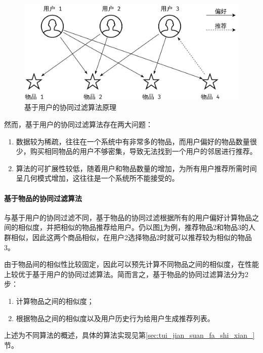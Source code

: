 \documentclass{article}
\begin{document}
\begin{figure}[htpb]
    \centering
    \includegraphics[width=0.8\linewidth]{userBasedCF.png}
    \caption{基于用户的协同过滤算法原理}
    \label{fig:userBasedCF}
\end{figure}
\par 然而，基于用户的协同过滤算法存在两大问题：
\begin{enumerate}
    \item 数据较为稀疏，往往在一个系统中有非常多的物品，而用户偏好的物品数量很少，购买相同物品的用户不够密集，导致无法找到一个用户的邻居进行推荐。
    \item 算法的可扩展性较低，随着用户和物品数量的增加，为所有用户推荐所需时间呈几何模式增加，这往往是一个系统所不能接受的。
\end{enumerate}

\paragraph{基于物品的协同过滤算法}
\label{par:ji_yu_wu_pin_de_xie_tong_guo_lu_suan_fa_}
\par 与基于用户的协同过滤不同，基于物品的协同过滤根据所有的用户偏好计算物品之间的相似度，并把相似的物品推荐给用户。仍以图\ref{fig:userBasedCF}为例，推荐物品2和物品3的人群相似，因此这两个商品相似，在用户2选择物品2时就可以推荐较为相似的物品3。
\par 由于物品间的相似性比较固定，因此可以预先计算不同物品之间的相似度，在性能上较优于基于用户的协同过滤算法。简而言之，基于物品的协同过滤算法分为2步：
\begin{enumerate}
    \item 计算物品之间的相似度；
    \item 根据物品之间的相似度以及用户历史行为给用户生成推荐列表。
\end{enumerate}


\par 上述为不同算法的概述，具体的算法实现见第\ref{sec:tui_jian_suan_fa_shi_xian_}节。
\end{document}
